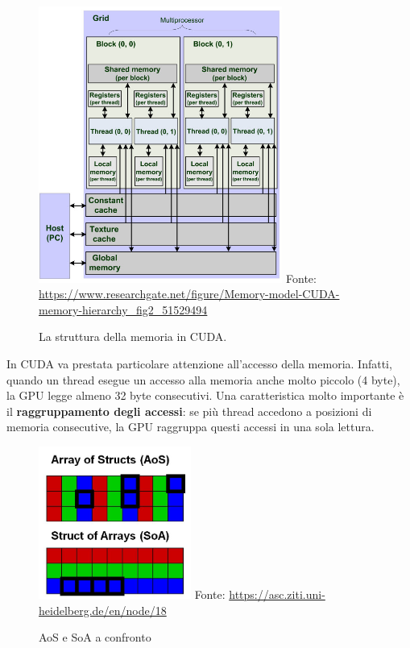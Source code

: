 \documentclass[12pt,a4paper,openright,twoside]{report}
\begin{document}
\begin{figure}[h]
    \centering
    \def\stackalignment{r}
    \stackunder
        {\includegraphics[width=8cm]{cuda-memory-hierarchy.jpg}}
        {\scriptsize Fonte: \url{https://www.researchgate.net/figure/Memory-model-CUDA-memory-hierarchy_fig2_51529494}}
    \caption{La struttura della memoria in CUDA.}
    \label{img:memory-hierarchy}
\end{figure}

In CUDA va prestata particolare attenzione all'accesso della memoria. Infatti, quando un thread esegue un accesso alla memoria anche molto piccolo (4 byte), la GPU legge almeno 32 byte consecutivi. Una caratteristica molto importante è il \textbf{raggruppamento degli accessi}: se più thread accedono a posizioni di memoria consecutive, la GPU raggruppa questi accessi in una sola lettura.

\begin{figure}
    \centering
    \def\stackalignment{r}
    \stackunder
        {\includegraphics[width=5cm]{aos.jpg}}
        {\scriptsize Fonte: \url{https://asc.ziti.uni-heidelberg.de/en/node/18}}
    \caption{AoS e SoA a confronto}
    \label{img:aos}
\end{figure}
\end{document}
